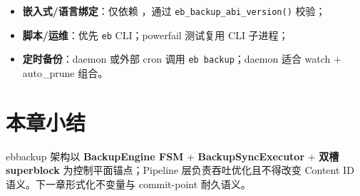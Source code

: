\begin{designbox}[集成建议]
\begin{itemize}[nosep]
  \item \textbf{嵌入式/语言绑定}：仅依赖 ，通过 \texttt{eb\_backup\_abi\_version()} 校验；
  \item \textbf{脚本/运维}：优先 \texttt{eb} CLI；powerfail 测试复用 CLI 子进程；
  \item \textbf{定时备份}：daemon 或外部 cron 调用 \texttt{eb backup}；daemon 适合 watch + auto\_prune 组合。
\end{itemize}
\end{designbox}

\section{本章小结}

ebbackup 架构以 \textbf{BackupEngine FSM} + \textbf{BackupSyncExecutor} + \textbf{双槽 superblock} 为控制平面锚点；Pipeline 层负责吞吐优化且不得改变 Content ID 语义。下一章形式化不变量与 commit-point 耐久语义。
